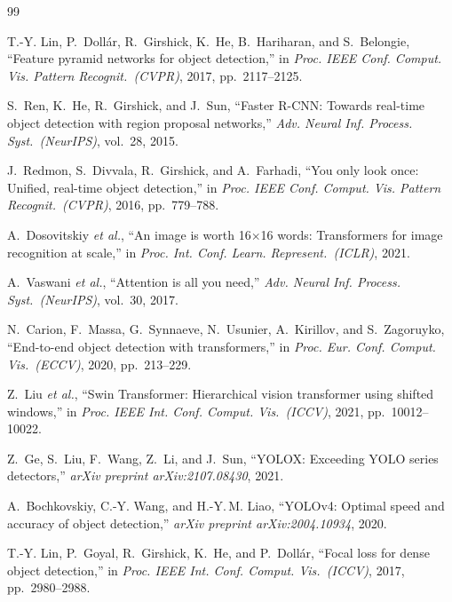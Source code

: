 \documentclass[conference]{IEEEtran}
\begin{document}
\begin{thebibliography}{99}

T.-Y. Lin, P.~Doll\'{a}r, R.~Girshick, K.~He, B.~Hariharan, and
S.~Belongie, ``Feature pyramid networks for object detection,'' in
\textit{Proc. IEEE Conf. Comput. Vis. Pattern Recognit.\ (CVPR)},
2017, pp.~2117--2125.

S.~Ren, K.~He, R.~Girshick, and J.~Sun, ``Faster R-CNN: Towards
real-time object detection with region proposal networks,''
\textit{Adv. Neural Inf. Process. Syst.\ (NeurIPS)}, vol.~28, 2015.

J.~Redmon, S.~Divvala, R.~Girshick, and A.~Farhadi, ``You only look
once: Unified, real-time object detection,'' in
\textit{Proc. IEEE Conf. Comput. Vis. Pattern Recognit.\ (CVPR)},
2016, pp.~779--788.

A.~Dosovitskiy \textit{et al.}, ``An image is worth 16$\times$16
words: Transformers for image recognition at scale,'' in
\textit{Proc. Int. Conf. Learn. Represent.\ (ICLR)}, 2021.

A.~Vaswani \textit{et al.}, ``Attention is all you need,''
\textit{Adv. Neural Inf. Process. Syst.\ (NeurIPS)}, vol.~30, 2017.

N.~Carion, F.~Massa, G.~Synnaeve, N.~Usunier, A.~Kirillov, and
S.~Zagoruyko, ``End-to-end object detection with transformers,'' in
\textit{Proc. Eur. Conf. Comput. Vis.\ (ECCV)}, 2020,
pp.~213--229.

Z.~Liu \textit{et al.}, ``Swin Transformer: Hierarchical vision
transformer using shifted windows,'' in \textit{Proc. IEEE Int.
Conf. Comput. Vis.\ (ICCV)}, 2021, pp.~10012--10022.

Z.~Ge, S.~Liu, F.~Wang, Z.~Li, and J.~Sun, ``YOLOX: Exceeding YOLO
series detectors,'' \textit{arXiv preprint arXiv:2107.08430}, 2021.

A.~Bochkovskiy, C.-Y. Wang, and H.-Y.\,M. Liao, ``YOLOv4: Optimal
speed and accuracy of object detection,'' \textit{arXiv preprint
arXiv:2004.10934}, 2020.

T.-Y. Lin, P.~Goyal, R.~Girshick, K.~He, and P.~Doll\'{a}r,
``Focal loss for dense object detection,'' in \textit{Proc. IEEE
Int. Conf. Comput. Vis.\ (ICCV)}, 2017, pp.~2980--2988.


\end{thebibliography}
\end{document}
